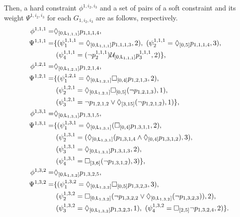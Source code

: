 \documentclass{article}
\newcommand{\Len}{{\sf L}}
\newcommand{\U}[1]{\mathcal{U}_{[#1]}}
\newcommand{\F}[1]{\Diamond_{[#1]}}
\newcommand{\G}[1]{\Box_{[#1]}}
\begin{document}
%
Then, a hard constraint $\phi^{1,i_2,i_3}$ and a set of pairs of a soft constraint and its weight $\Psi^{1,i_2,i_3}$ for each $G_{1,i_2,i_3}$ are as follows, respectively.
%
\begin{align}
\phi^{1,1,1}=&\F{0,\Len_{1,1,1}}p_{1,1,1,4},\notag \\
\Psi^{1,1,1} 
=&\{
(\psi^{1,1,1}_1 =\F{0,\Len_{1,1,1}}p_{1,1,1,3}, 2),~
(\psi^{1,1,1}_2 =\F{0,5}p_{1,1,1,4},3),\notag\\
&~(\psi^{1,1,1}_4 =(\lnot p_2^{1,1,1}) \U{0,\Len_{1,1,1}}p_3^{1,1,1}, 2)
\} ,\notag
\\
%
%
\phi^{1,2,1}=&\F{0,\Len_{1,2,1}}p_{1,2,1,4},\notag \\
\Psi^{1,2,1} 
=&\{
(\psi^{1,2,1}_1=\F{0,\Len_{1,2,1}}\G{0,4}p_{1,2,1,3},2),\notag \\&~
(\psi^{1,2,1}_2=\F{0,\Len_{1,2,1}}\G{0,5}(\lnot p_{1,2,1,3}),1),\notag\\&~
(\psi^{1,2,1}_3= \lnot p_{1,2,1,2} \lor \F{3,15}(\lnot p_{1,2,1,2}),1)
\},\notag
\\ %
\phi^{1,3,1}=&\F{0,\Len_{1,3,1}}p_{1,3,1,5},\notag \\
\Psi^{1,3,1} 
=&\{
(\psi^{1,3,1}_1=\F{0,\Len_{1,3,1}}(\G{0,4}p_{1,3,1,1}, 2),\notag \\
&~(\psi^{1,3,1}_2=(\F{0,\Len_{1,3,1}}(p_{1,3,1,4}\land \F{0,4}p_{1,3,1,2}), 3),\notag \\
&~(\psi^{1,3,1}_3=\F{0,\Len_{1,3,1}}p_{1,3,1,3}, 2),\notag \\
&~
(\psi^{1,3,1}_4=\G{3,6}(\lnot p_{1,3,1,2}), 3)
\} ,
\notag \\
\phi^{1,3,2}=&\F{0,\Len_{1,3,2}}p_{1,3,2,5} ,\notag \\
\Psi^{1,3,2} 
=&\{
(\psi^{1,3,2}_1=\F{0,\Len_{1,3,2}}\G{0,5}p_{1,3,2,3}, 3),\notag \\
&~
(\psi^{1,3,2}_2=\G{0,\Len_{1,3,2}}(\lnot p_{1,3,2,2}\lor\F{0,\Len_{1,3,2}}(\lnot p_{1,3,2,3})), 2),\notag \\
&~(\psi^{1,3,2}_3=\F{0,\Len_{1,3,2}}p_{1,3,2,3}, 1),~
(\psi^{1,3,2}_4=\G{2,5}\lnot p_{1,3,2,4}, 2)\}
 .\notag
\end{align}
%
%
%
\end{document}
